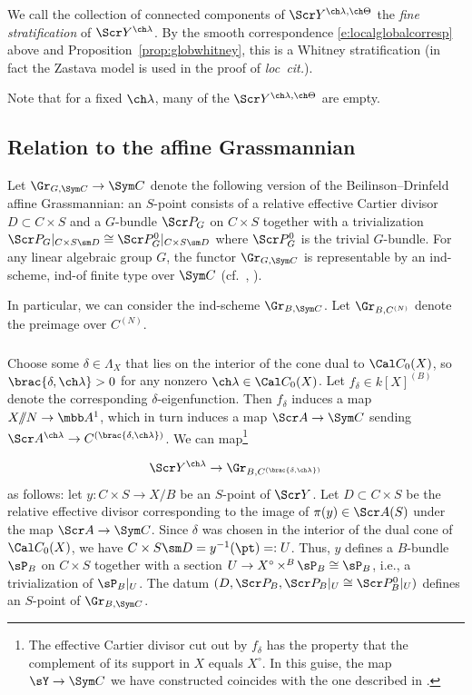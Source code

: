 \documentclass[final]{amsart}
\theoremstyle{remark}
\theoremstyle{definition}
\DeclareMathOperator*{\xt}{\times}
\numberwithin{equation}{section}
\begin{document}
We call the collection of connected components of $\Scr Y^{\ch\lambda,\ch\Theta}$ the
\emph{fine stratification} of $\Scr Y^{\ch\lambda}$. By the smooth
correspondence \eqref{e:localglobalcorresp} above 
and Proposition~\ref{prop:globwhitney}, this is a Whitney stratification (in fact
the Zastava model is used in the proof of \emph{loc~cit.}).

Note that for a fixed $\ch\lambda$, many of the 
 $\Scr Y^{\ch\lambda,\ch\Theta}$ are empty.



\subsection{Relation to the affine Grassmannian} \label{sect:YGr} 

Let $\Gr_{G,\Sym C} \to \Sym C$ denote the following version of the Beilinson--Drinfeld affine Grassmannian: an $S$-point consists of a relative effective Cartier divisor $D \subset C\times S$ and a $G$-bundle $\Scr P_G$ on $C\times S$ together with a trivialization
$\Scr P_G|_{C\times S \sm D} \cong \Scr P_G^0|_{C\times S\sm D}$ where 
$\Scr P_G^0$ is the trivial $G$-bundle. 
For any linear algebraic group $G$, the functor $\Gr_{G,\Sym C}$ is representable by an ind-scheme, ind-of finite type
over $\Sym C$ (cf.~\cite{BD}, \cite[Theorem 3.1.3]{Xinwen}).

In particular, we can consider the ind-scheme 
$\Gr_{B,\Sym C}$. Let 
$\Gr_{B,C^{(N)}}$ denote the preimage over $C^{(N)}$. 

\subsubsection{} \label{sss:YGr}
Choose some $\delta \in \Lambda_X$ that lies on the interior of the
cone dual to $\Cal C_0(X)$, so $\brac{\delta,\ch\lambda}>0$
for any nonzero $\ch\lambda \in \Cal C_0(X)$.
Let $f_\delta \in k[X]^{(B)}$ denote the corresponding $\delta$-eigenfunction. 
Then $f_\delta$ induces a map $X/\!\!/N \to \mbb A^1$, which 
in turn induces a map $\Scr A \to \Sym C$ sending 
$\Scr A^{\ch\lambda} \to C^{(\brac{\delta,\ch\lambda})}$. 
We can map\footnote{
The effective Cartier divisor cut out by $f_\delta$ 
has the property that the complement of its support in $X$ equals $X^\circ$. 
In this guise, the map $\sY \to \Sym C$ we have constructed coincides with
the one described in \cite[Remark 4.2.6]{Drinfeld}.}

\begin{equation} \label{e:YGr}
    \Scr Y^{\ch\lambda} \to \Gr_{B,C^{(\brac{\delta,\ch\lambda})}} 
\end{equation}
as follows:
let $y : C\times S \to X/B$ be an $S$-point of $\Scr Y$. 
Let $D \subset C \times S$ be the relative effective divisor corresponding
to the image of $\pi(y)\in \Scr A(S)$ under the map $\Scr A \to \Sym C$.
Since $\delta$ was chosen in the interior of the dual cone of $\Cal C_0(X)$, we have
$C\times S \sm D = y^{-1}(\pt) =: U$. 
Thus, $y$ defines a $B$-bundle $\sP_B$ on $C \xt S$ together with 
a section $U \to X^\circ \xt^B \sP_B \cong \sP_B$, i.e., a trivialization of 
$\sP_B|_U$. 
The datum $(D, \Scr P_B, \Scr P_B|_U \cong \Scr P_B^0|_U)$ defines an $S$-point 
of $\Gr_{B,\Sym C}$. 
\end{document}
